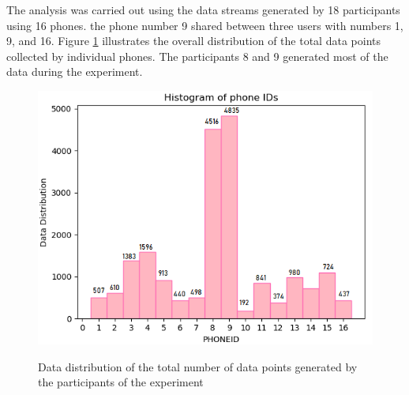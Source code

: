 
The analysis was carried out using the data streams generated by 18 participants using 16 phones. the phone number 9 shared between three users with numbers 1, 9, and 16. Figure \ref{userphone} illustrates the overall distribution of the total data points collected by individual phones. The participants 8 and 9 generated most of the data during the experiment.  


\begin{figure}[!ht]
    \centering
    \includegraphics[width=.7\textwidth]{image/Chapters/Chapter6/phoneID_data.png}
    \\[\smallskipamount]    
    \caption{Data distribution of the total number of data points generated by the participants of the experiment}
    \label{userphone}
\end{figure}




